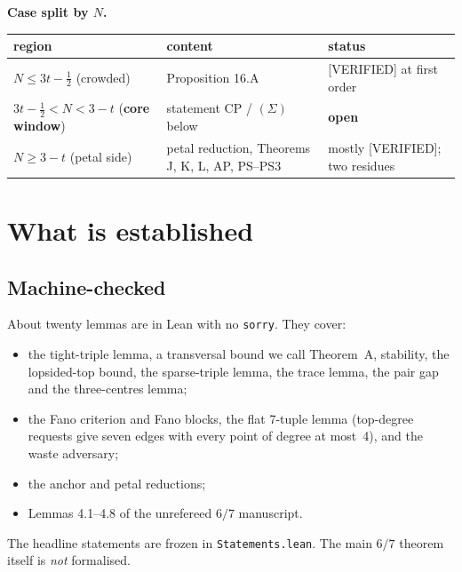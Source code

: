 \documentclass[11pt]{article}
\newcommand{\st}[1]{\textsf{\small[#1]}}
\begin{document}
\textbf{Case split by $N$.}
\begin{center}\small
\begin{tabular}{@{}p{4.6cm}p{5.6cm}p{4.6cm}@{}}\toprule
region & content & status\\\midrule
$N\le 3t-\tfrac12$ (crowded) & Proposition 16.A & \st{VERIFIED} at first order\\
$3t-\tfrac12<N<3-t$ (\textbf{core window}) & statement CP / $(\Sigma)$ below & \textbf{open}\\
$N\ge 3-t$ (petal side) & petal reduction, Theorems J, K, L, AP, PS--PS3 & mostly \st{VERIFIED}; two residues\\\bottomrule
\end{tabular}
\end{center}

\section{What is established}
\subsection{Machine-checked}
About twenty lemmas are in Lean with no \texttt{sorry}. They cover:
\begin{itemize}
\item the tight-triple lemma, a transversal bound we call Theorem~A, stability, the lopsided-top bound, the
sparse-triple lemma, the trace lemma, the pair gap and the three-centres lemma;
\item the Fano criterion and Fano blocks, the flat 7-tuple lemma (top-degree requests give seven edges with every
point of degree at most~4), and the waste adversary;
\item the anchor and petal reductions;
\item Lemmas 4.1--4.8 of the unrefereed $6/7$ manuscript.
\end{itemize}
The headline statements are frozen in \texttt{Statements.lean}. The main $6/7$ theorem itself is \emph{not}
formalised.
\end{document}
